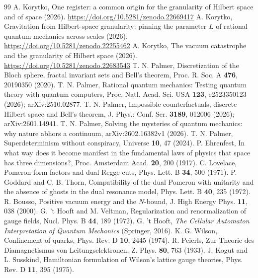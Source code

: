 \documentclass[aps,prd,twocolumn,superscriptaddress,nofootinbib]{revtex4-2}
\begin{document}
\begin{thebibliography}{99}
 A. Korytko, One register: a common origin for the granularity of Hilbert space and of space (2026). \mbox{\url{https://doi.org/10.5281/zenodo.22669417}}
 A. Korytko, Gravitation from Hilbert-space granularity: pinning the parameter $L$ of rational quantum mechanics across scales (2026). \mbox{\url{https://doi.org/10.5281/zenodo.22255462}}
 A. Korytko, The vacuum catastrophe and the granularity of Hilbert space (2026). \mbox{\url{https://doi.org/10.5281/zenodo.22683543}}
 T. N. Palmer, Discretization of the Bloch sphere, fractal invariant sets and Bell's theorem, Proc. R. Soc. A \textbf{476}, 20190350 (2020).
 T. N. Palmer, Rational quantum mechanics: Testing quantum theory with quantum computers, Proc. Natl. Acad. Sci. USA \textbf{123}, e2523350123 (2026); arXiv:2510.02877.
 T. N. Palmer, Impossible counterfactuals, discrete Hilbert space and Bell's theorem, J. Phys.: Conf. Ser. \textbf{3189}, 012006 (2026); arXiv:2601.14941.
 T. N. Palmer, Solving the mysteries of quantum mechanics: why nature abhors a continuum, arXiv:2602.16382v1 (2026).
 T. N. Palmer, Superdeterminism without conspiracy, Universe \textbf{10}, 47 (2024).
 P. Ehrenfest, In what way does it become manifest in the fundamental laws of physics that space has three dimensions?, Proc. Amsterdam Acad. \textbf{20}, 200 (1917).
 C. Lovelace, Pomeron form factors and dual Regge cuts, Phys. Lett. B \textbf{34}, 500 (1971).
 P. Goddard and C. B. Thorn, Compatibility of the dual Pomeron with unitarity and the absence of ghosts in the dual resonance model, Phys. Lett. B \textbf{40}, 235 (1972).
 R. Bousso, Positive vacuum energy and the $N$-bound, J. High Energy Phys. \textbf{11}, 038 (2000).
 G. 't Hooft and M. Veltman, Regularization and renormalization of gauge fields, Nucl. Phys. B \textbf{44}, 189 (1972).
 G. 't Hooft, \emph{The Cellular Automaton Interpretation of Quantum Mechanics} (Springer, 2016).
 K. G. Wilson, Confinement of quarks, Phys. Rev. D \textbf{10}, 2445 (1974).
 R. Peierls, Zur Theorie des Diamagnetismus von Leitungselektronen, Z. Phys. \textbf{80}, 763 (1933).
 J. Kogut and L. Susskind, Hamiltonian formulation of Wilson's lattice gauge theories, Phys. Rev. D \textbf{11}, 395 (1975).

\end{thebibliography}
\end{document}
